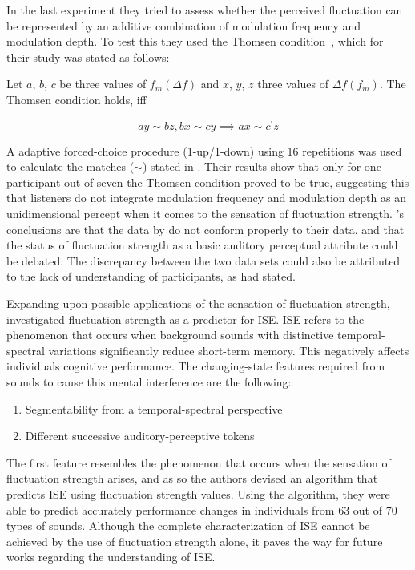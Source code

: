 \documentclass[../main.tex]{subfiles}
\begin{document}
\begin{theoreticalbackground}
In the last experiment they tried to assess whether the perceived fluctuation
can be represented by an additive combination of modulation frequency and
modulation depth. To test this they used the Thomsen
condition~\cite{Falmagne1976}, which for their study was stated as follows:

\begin{mdframed}

  Let $a$, $b$, $c$ be three values of $f_m(\Delta f)$ and $x$, $y$, $z$ three
  values of $\Delta f(f_m)$. The Thomsen condition holds, iff

  \begin{equation}
    ay \sim bz, bx \sim cy \implies ax \sim c^{\prime} z
    \label{eq:thomsen}
  \end{equation}

\end{mdframed}

A adaptive forced-choice procedure (1-up/1-down) using 16 repetitions was used to
calculate the matches ($\sim$) stated in . Their results show
that only for one participant out of seven the Thomsen condition proved to be
true, suggesting this  that listeners do not integrate modulation frequency and
modulation depth as an unidimensional percept when it comes to the sensation of
fluctuation strength. \citeauthor{Wickelmaier2004Scaling}'s conclusions are that
the data by \citeauthor{Fastl2007Psychoacoustics} do not conform properly to
their data, and that the status of fluctuation strength as a basic auditory
perceptual attribute could be debated. The discrepancy between the two data sets
could also be attributed to the lack of understanding of participants, as
\citeauthor{Accolti2009Fluctuation} had stated.

Expanding upon possible applications of the sensation of fluctuation strength,
\textcite{Schlittmeier2012} investigated fluctuation strength as a predictor for
\gls{ISE}. \gls{ISE} refers to the phenomenon that occurs when background sounds
with distinctive temporal-spectral variations significantly reduce short-term
memory. This negatively affects individuals cognitive performance. The
changing-state features required from sounds to cause this mental interference
are the following:
\begin{enumerate}
  \item Segmentability from a temporal-spectral perspective
  \item Different successive auditory-perceptive tokens
\end{enumerate}

The first feature resembles the phenomenon that occurs when the sensation of
fluctuation strength arises, and as so the authors devised an algorithm that
predicts \gls{ISE} using fluctuation strength values. Using the algorithm, they
were able to predict accurately performance changes in individuals from 63 out
of 70 types of sounds. Although the complete characterization of \gls{ISE}
cannot be achieved by the use of fluctuation strength alone, it paves the way
for future works regarding the understanding of \gls{ISE}.

\end{theoreticalbackground}
\end{document}
